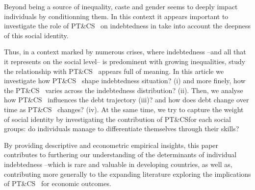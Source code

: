 \documentclass[a4paper, 11pt, onecolumn]{article}
\newcommand{\PTCS}{PT\&CS}
\begin{document}
Beyond being a source of inequality, caste and gender seems to deeply impact individuals by conditionning them.
In this context it appears important to investigate the role of \PTCS~ on indebtedness in take into account the deepness of this social identity.




Thus, in a context marked by numerous crises, where indebtedness --and all that it represents on the social level-- is predominent with growing inequalities, study the relationship with \PTCS~ appears full of meaning.
In this article we investigate how \PTCS~ shape indebtedness situation? (i) and more finely, how the \PTCS~ varies across the indebtedness distribution? (ii).
Then, we analyse how \PTCS~ influences the debt trajectory (iii)? and how does debt change over time as \PTCS~ changes? (iv).
At the same time, we try to capture the weight of social identity by investigating the contribution of \PTCS for each social groups: do individuals manage to differentiate themselves through their skills?

By providing descriptive and econometric empirical insights, this paper contributes to furthering our understanding of the determinants of individual indebtedness --which is rare and valuable in developing countries, as well as, contributing more generally to the expanding literature exploring the implications of \PTCS~ for economic outcomes.
\end{document}
